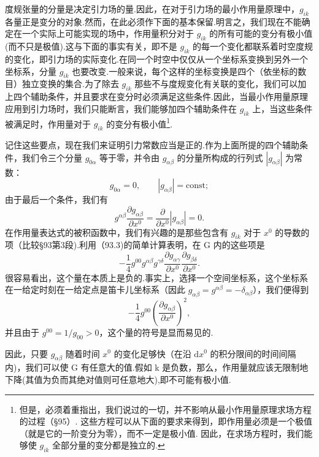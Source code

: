 度规张量的分量是决定引力场的量.因此，在对于引力场的最小作用量原理中，$g_{ik}$ 各量正是变分的对象.然而，在此必须作下面的基本保留.明言之，我们现在不能确定在一个实际上可能实现的场中，作用量积分对于 $g_{ik}$ 的所有可能的变分有极小值(而不只是极值).这与下面的事实有关，即不是 $g_{ik}$ 的每一个变化都联系着时空度规的变化，即引力场的实际变化.在同一个时空中仅仅从一个坐标系变换到另外一个坐标系，分量 $g_{ik}$ 也要改变.一般来说，每个这样的坐标变换是四个（依坐标的数目）独立变换的集合.为了除去 $g_{ik}$ 那些不与度规变化有关联的变化，我们可以加上四个辅助条件，并且要求在变分时必须满足这些条件.因此，当最小作用量原理应用到引力场时，我们只能断言，我们能够加四个辅助条件在 $g_{ik}$ 上，当这些条件被满足时，作用量对于 $g_{ik}$ 的变分有极小值\footnote{但是，必须着重指出，我们说过的一切，并不影响从最小作用量原理求场方程的过程（§95）. 这些方程可以从下面的要求来得到，即作用量必须是一个极值（就是它的一阶变分为零），而不一定是极小值. 因此，在求场方程时，我们能够使 $g_{ik}$ 全部分量的变分都是独立的.}.

记住这些要点，现在我们来证明引力常数应当是正的.作为上面所提的四个辅助条件，我们令三个分量 $g_{0\alpha}$ 等于零，并令由 $g_{\alpha\beta}$ 的分量所构成的行列式 $\left|g_{\alpha\beta}\right|$ 为常数：
\begin{equation*}
  g_{0\alpha}=0,\qquad |g_{\alpha\beta}|=\mathrm{const};
\end{equation*}
由于最后一个条件，我们有
\begin{equation*}
  g^{\alpha\beta}\frac{\partial g_{\alpha\beta}}{\partial x^0}
  =\frac{\partial}{\partial x^0}|g_{\alpha\beta}|=0.
\end{equation*}
在作用量表达式的被积函数中，我们有兴趣的是那些包含有 $g_{ik}$ 对于 $x^0$ 的导数的项（比较§93第3段).利用（93.3)的简单计算表明，在 G 内的这些项是
\begin{equation*}
  -\frac{1}{4}g^{00}g^{\alpha\beta}g^{\gamma\delta}
  \frac{\partial g_{\alpha\gamma}}{\partial x^0}
  \frac{\partial g_{\beta\delta}}{\partial x^0}.
\end{equation*}
很容易看出，这个量在本质上是负的.事实上，选择一个空间坐标系，这个坐标系在一给定时刻在一给定点是笛卡儿坐标系（因此 $g_{\alpha\beta}=g^{\alpha\beta}=-\delta_{\alpha\beta}$），我们便得到
\begin{equation*}
  -\frac{1}{4}g^{00}\left(\frac{\partial g_{\alpha\beta}}{\partial x^0}\right)^2,
\end{equation*}
并且由于 $g^{00}=1/g_{00}>0$，这个量的符号是显而易见的.

因此，只要 $g_{\alpha\beta}$ 随着时间 $x^0$ 的变化足够快（在沿 $\mathrm{d}x^0$ 的积分限间的时间间隔内)，我们可以使 G 有任意大的值.假如 k 是负数，那么，作用量就应该无限制地下降(其值为负而其绝对值则可任意地大),即不可能有极小值.

